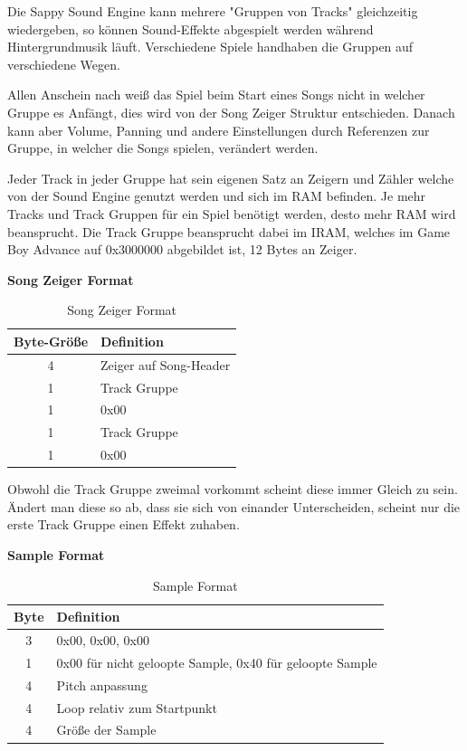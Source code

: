 \documentclass[11pt,a4paper]{scrartcl}
\begin{document}
Die Sappy Sound Engine kann mehrere "Gruppen von Tracks" gleichzeitig wiedergeben, so k\"{o}nnen Sound-Effekte abgespielt werden w\"{a}hrend Hintergrundmusik l\"{a}uft. Verschiedene Spiele handhaben die Gruppen auf verschiedene Wegen.

Allen Anschein nach wei{\ss} das Spiel beim Start eines Songs nicht in welcher Gruppe es Anf\"{a}ngt, dies wird von der Song Zeiger Struktur entschieden. Danach kann aber Volume, Panning und andere Einstellungen durch Referenzen zur Gruppe, in welcher die Songs spielen, ver\"{a}ndert werden.

Jeder Track in jeder Gruppe hat sein eigenen Satz an Zeigern und Z\"{a}hler welche von der Sound Engine genutzt werden und sich im RAM befinden. Je mehr Tracks und Track Gruppen f\"{u}r ein Spiel ben\"{o}tigt werden, desto mehr RAM wird beansprucht.\newline
Die Track Gruppe beansprucht dabei im IRAM, welches im Game Boy Advance auf 0x3000000 abgebildet ist, 12 Bytes an Zeiger. 


\vspace{15pt}
\textbf{{\large Song Zeiger Format}}

\begin{table}[h]
    \centering
    \begin{tabular}{ c | p{8cm} }
        \textbf{Byte-Gr\"{o}{\ss}e} & \textbf{Definition}\\
        \hline
        4 & Zeiger auf Song-Header\\
				\hline
        1 & Track Gruppe\\
				\hline
        1 & 0x00\\
				\hline
        1 & Track Gruppe\\
				\hline
        1 & 0x00\\
    \end{tabular}
    \caption{Song Zeiger Format}
    \label{table:SongZeiger}
\end{table}

Obwohl die Track Gruppe zweimal vorkommt scheint diese immer Gleich zu sein. \"{A}ndert man diese so ab, dass sie sich von einander Unterscheiden, scheint nur die erste Track Gruppe einen Effekt zuhaben.


\newpage
\textbf{{\large Sample Format}}

\begin{table}[h]
    \centering
    \begin{tabular}{ c | p{15cm} }
        \textbf{Byte} & \textbf{Definition}\\
				\hline
        3 & 0x00, 0x00, 0x00\\
				\hline
        1 & 0x00 f\"{u}r nicht geloopte Sample, 0x40 f\"{u}r geloopte Sample\\
				\hline
        4 & Pitch anpassung\\
				\hline
        4 & Loop relativ zum Startpunkt\\
				\hline
        4 & Gr\"{o}{\ss}e der Sample\\
    \end{tabular}
    \caption{Sample Format}
    \label{table:SampleFormat}
\end{table}
\end{document}
